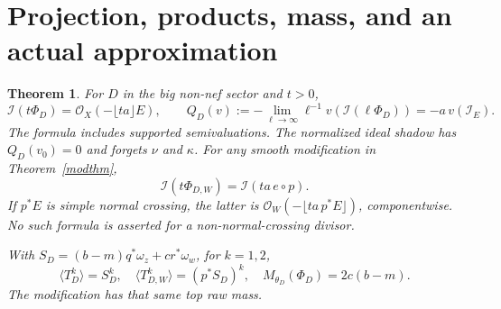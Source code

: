 \documentclass[11pt]{article}
\newtheorem{theorem}{Theorem}[section]
\theoremstyle{remark}\newtheorem{remark}[theorem]{Remark}
\newcommand{\cI}{\mathcal I}
\begin{document}
\section{Projection, products, mass, and an actual approximation}
\begin{theorem}\label{shadowthm}
For $D$ in the big non-nef sector and $t>0$,
\[
 \cI(t\Phi_D)=\mathcal O_X(-\lfloor ta\rfloor E),\qquad
 Q_D(v):=-\lim_{\ell\to\infty}
   \ell^{-1}v(\cI(\ell\Phi_D))=-a\,v(\mathcal I_E).
 \tag{5.1}
\]
The formula includes supported semivaluations. The normalized
ideal shadow has $Q_D(v_0)=0$ and forgets $\nu$ and $\kappa$.
For any smooth modification in Theorem~\ref{modthm},
\[
 \cI(t\Phi_{D,W})=\cI(ta\,e\circ p).
 \tag{5.2}
\]
If $p^*E$ is simple normal crossing, the latter is
$\mathcal O_W(-\lfloor ta\,p^*E\rfloor)$, componentwise.
No such formula is asserted for a non-normal-crossing divisor.

With $S_D=(b-m)q^*\omega_z+cr^*\omega_w$, for $k=1,2$,
\[
 \langle T_D^k\rangle=S_D^k,\quad
 \langle T_{D,W}^k\rangle=(p^*S_D)^k,\quad
 M_{\theta_D}(\Phi_D)=2c(b-m).
 \tag{5.3}
\]
The modification has that same top raw mass.
\end{theorem}
\end{document}
